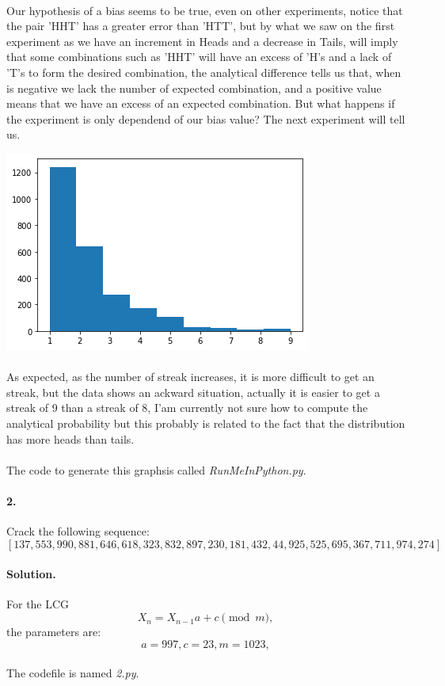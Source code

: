 \documentclass{article}
\begin{document}
\paragraph{} Our hypothesis of a bias seems to be true, even on other experiments, notice that the pair 'HHT' has a greater error than 'HTT', but by what we saw on the first experiment as we have an increment in Heads and a decrease in Tails, will imply that some combinations such as 'HHT' will have an excess of 'H's and a lack of 'T's to form the desired combination, the analytical difference tells us that, when is negative we lack the number of expected combination, and a positive value means that we have an excess of an expected combination. But what happens if the experiment is only dependend of our bias value? The next experiment will tell us.
\begin{center}
	\includegraphics[width=0.4\linewidth]{streak.png}
\end{center}
\paragraph{}As expected, as the number of streak increases, it is more difficult to get an streak, but the data shows an ackward situation, actually it is easier to get a streak of 9 than a streak of 8, I'am currently not sure how to compute the analytical probability but this probably is related to the fact that the distribution has more heads than tails.
\begin{center}
\end{center}
\paragraph{}The code to generate this graphsis called \textit{RunMeInPython.py}.
\paragraph{2.} Crack the following sequence:
$$[137, 553, 990, 881, 646, 618, 323, 832, 897, 230, 181, 432, 44, 925, 525, 695, 367, 711, 974, 274]$$
\paragraph{Solution.} For the LCG
$$X_n =  X_{n-1}a + c \pmod{m},$$
the parameters are:
$$a=997, c= 23, m= 1023,$$
\paragraph{}The codefile is named \textit{2.py}.
\end{document}
